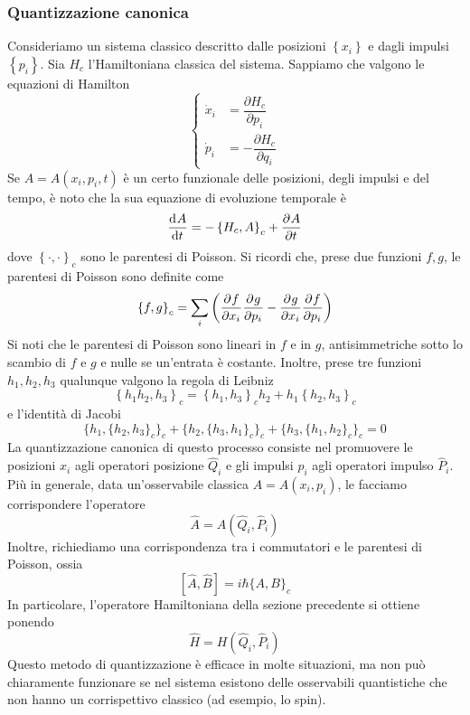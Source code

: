 \documentclass[a4paper, 11pt]{article}
\newcommand{\pos}{\hat{Q}}
\newcommand{\Imp}{\hat{P}}
\newcommand{\ham}{\hat{H}}
\begin{document}
\subsubsection{Quantizzazione canonica}
Consideriamo un sistema classico descritto dalle posizioni $\left\{x_i\right\}$ e dagli impulsi $\left\{p_i\right\}$. Sia $H_c$ l'Hamiltoniana classica del sistema. Sappiamo che valgono le equazioni di Hamilton
\[\begin{cases}
\dot{x}_i&=\dfrac{\partial H_c}{\partial p_i}\\[10pt]
\dot{p}_i&=-\dfrac{\partial H_c}{\partial q_i}
\end{cases}\]
Se $A=A(x_i,p_i,t)$ è un certo funzionale delle posizioni, degli impulsi e del tempo, è noto che la sua equazione di evoluzione temporale è
\[\dfrac{\mathrm{d} ^{}A}{\mathrm{d} {t}^{}}=-\left\{H_c,A\right\}_c+\dfrac{\partial ^{}A}{\partial {t}^{}}\]
dove $\left\{\cdot,\cdot\right\}_c$ sono le parentesi di Poisson. Si ricordi che, prese due funzioni $f,g$, le parentesi di Poisson sono definite come
\[\left\{f,g\right\}_c=\sum_{i}\left(\dfrac{\partial ^{}f}{\partial {x_i}^{}}\dfrac{\partial ^{}g}{\partial {p_i}^{}}-\dfrac{\partial ^{}g}{\partial {x_i}^{}}\dfrac{\partial ^{}f}{\partial {p_i}^{}}\right)\]
Si noti che le parentesi di Poisson sono lineari in $f$ e in $g$, antisimmetriche sotto lo scambio di $f$ e $g$ e nulle se un'entrata è costante. Inoltre, prese tre funzioni $h_1,h_2,h_3$ qualunque valgono la regola di Leibniz
\[\left\{h_1h_2,h_3\right\}_c=\left\{h_1,h_3\right\}_ch_2+h_1\left\{h_2,h_3\right\}_c\]
e l'identità di Jacobi
\[\{h_1,\{h_2,h_3\}_c\}_c+\{h_2,\{h_3,h_1\}_c\}_c+\{h_3,\{h_1,h_2\}_c\}_c=0\]
La quantizzazione canonica di questo processo consiste nel promuovere le posizioni $x_i$ agli operatori posizione $\pos_i$ e gli impulsi $p_i$ agli operatori impulso $\Imp_i$. Più in generale, data un'osservabile classica $A=A(x_i,p_i)$, le facciamo corrispondere l'operatore
\[\hat{A}=A(\pos_i,\Imp_i)\]
Inoltre, richiediamo una corrispondenza tra i commutatori e le parentesi di Poisson, ossia
\[[\hat{A},\hat{B}]=i\hbar\{A,B\}_c\]
In particolare, l'operatore Hamiltoniana della sezione precedente si ottiene ponendo
\[\ham=H(\pos_i,\Imp_i)\]
Questo metodo di quantizzazione è efficace in molte situazioni, ma non può chiaramente funzionare se nel sistema esistono delle osservabili quantistiche che non hanno un corrispettivo classico (ad esempio, lo spin).
\end{document}
